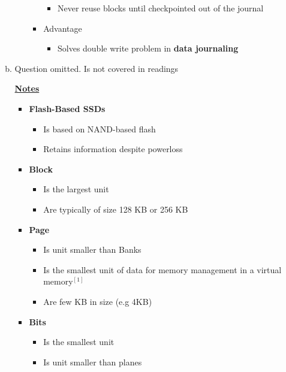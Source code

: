 \documentclass[12pt]{article}
\begin{document}
\begin{enumerate}[1.]
\begin{enumerate}[a)]
\begin{itemize}
\begin{itemize}
                \begin{itemize}
                    \item Never reuse blocks until checkpointed out of the journal
                \end{itemize}
                \item Advantage
                \begin{itemize}
                    \item Solves double write problem in \textbf{data journaling}
                \end{itemize}
            \end{itemize}
        \end{itemize}

        \item Question omitted. Is not covered in readings

        \bigskip

        \underline{\textbf{Notes}}

        \begin{itemize}
            \item \textbf{Flash-Based SSDs}
            \begin{itemize}
                \item Is based on NAND-based flash
                \item Retains information despite powerloss
            \end{itemize}

            \item \textbf{Block}
            \begin{itemize}
                \item Is the largest unit
                \item Are typically of size 128 KB or 256 KB
            \end{itemize}
            \item \textbf{Page}
            \begin{itemize}
                \item Is unit smaller than Banks
                \item Is the smallest unit of data for memory management in a virtual memory$^{[1]}$
                \item Are few KB in size (e.g 4KB)
            \end{itemize}
            \item \textbf{Bits}
            \begin{itemize}
                \item Is the smallest unit
                \item Is unit smaller than planes
            \end{itemize}
        \end{itemize}


\end{enumerate}
\end{enumerate}
\end{document}
